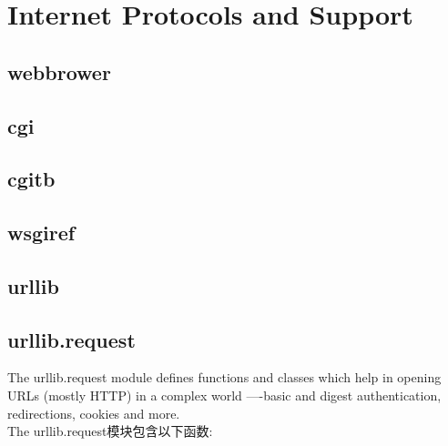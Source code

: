 \chapter{Internet Protocols and Support}
\section{webbrower}






\section{cgi}






\section{cgitb}






\section{wsgiref}






\section{urllib}






\section{urllib.request}
The urllib.request module defines functions and classes which help in opening URLs (mostly HTTP) in
a complex world ----basic and digest authentication, redirections, cookies and more.\\
The urllib.request模块包含以下函数:\\

